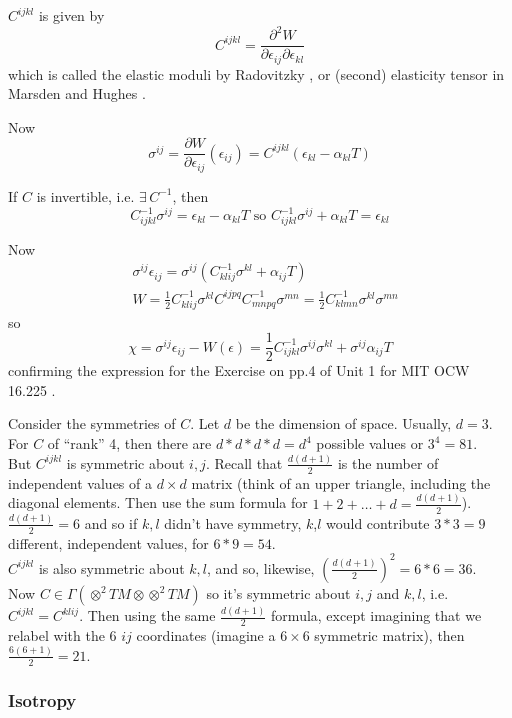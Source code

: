 \documentclass[twoside,landscape,10pt]{amsart}
\theoremstyle{plain}
\theoremstyle{definition}
\theoremstyle{remark}
\begin{document}
\begin{multicols*}{2}
$C^{ijkl}$ is given by 
\[
C^{ijkl} = \frac{ \partial^2 W}{ \partial \epsilon_{ij} \partial \epsilon_{kl} }
\]
which is called the elastic moduli by Radovitzky \cite{RRadovitzky2003}, or (second) elasticity tensor in Marsden and Hughes \cite{JMarsdenTHughes1994}.  

Now
\[
\sigma^{ij} = \frac{ \partial W}{ \partial \epsilon_{ij}}(\epsilon_{ij}) = C^{ijkl}(\epsilon_{kl} - \alpha_{kl}T)
\]

If $C$ is invertible, i.e. $\exists \, C^{-1}$, then
\[
C^{-1}_{ijkl} \sigma^{ij} = \epsilon_{kl} - \alpha_{kl}T \text{ so } C^{-1}_{ijkl}\sigma^{ij} + \alpha_{kl} T = \epsilon_{kl}
\]

Now
\[
\begin{aligned}
& \sigma^{ij} \epsilon_{ij} = \sigma^{ij}(C^{-1}_{klij} \sigma^{kl} + \alpha_{ij} T) \\
& W =\frac{1}{2} C^{-1}_{klij} \sigma^{kl} C^{ijpq}C^{-1}_{mnpq}\sigma^{mn} = \frac{1}{2} C^{-1}_{klmn}\sigma^{kl} \sigma^{mn}  
\end{aligned}
\]
so
\[
\chi = \sigma^{ij}\epsilon_{ij} - W(\epsilon) = \frac{1}{2} C^{-1}_{ijkl} \sigma^{ij}\sigma^{kl} + \sigma^{ij}\alpha_{ij}T
\]
confirming the expression for the Exercise on pp.4 of Unit 1 for MIT OCW 16.225 \cite{RRadovitzky2003}.  

Consider the symmetries of $C$.  Let $d$ be the dimension of space.  Usually, $d=3$.  \\
For $C$ of ``rank'' 4, then there are $d*d*d*d= d^4$ possible values or $3^4=81$.  \\
But $C^{ijkl}$ is symmetric about $i,j$.  Recall that $\frac{d(d+1)}{2}$ is the number of independent values of a $d\times d$ matrix (think of an upper triangle, including the diagonal elements. Then use the sum formula for $1+2+\dots + d = \frac{d(d+1)}{2}$).  $\frac{d(d+1)}{2} = 6$ and so if $k,l$ didn't have symmetry, $k$,$l$ would contribute $3*3=9$ different, independent values, for $6*9=54$.\\
$C^{ijkl}$ is also symmetric about $k,l$, and so, likewise, $(\frac{d(d+1)}{2})^2 = 6*6=36$.  \\
Now $C\in \Gamma(\otimes^2 TM \otimes \otimes^2TM)$ so it's symmetric about $i,j$ and $k,l$, i.e. $C^{ijkl} = C^{klij}$.  Then using the same $\frac{d(d+1)}{2}$ formula, except imagining that we relabel with the 6 $ij$ coordinates (imagine a $6\times 6$ symmetric matrix), then $\frac{6(6+1)}{2} = 21$.

\subsubsection{Isotropy}


\end{multicols*}
\end{document}
